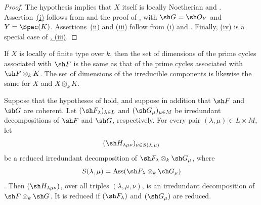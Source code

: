 \begin{proof}
The hypothesis implies that $X$ itself is locally Noetherian
 and .
Assertion~\hyperref[IV.4.2.7.i]{(i)} follows from
 and the proof of , with
$\sh G=\sh O_Y$ and $Y=\Spec(K)$.
Assertions~\hyperref[IV.4.2.7.ii]{(ii)} and
\hyperref[IV.4.2.7.iii]{(iii)} follow from
\hyperref[IV.4.2.7.i]{(i)} and .
Finally, \hyperref[IV.4.2.7.iv]{(iv)} is a special case of
\hyperref[IV.4.2.4.iii]{, (iii)}.
\end{proof}

\begin{corollary}[4.2.8]
\label{IV.4.2.8}
If $X$ is locally of finite type over $k$, then the set of dimensions
of the prime cycles associated with $\sh F$ is the same as that of the
prime cycles associated with $\sh F\otimes_k K$.
The set of dimensions of the irreducible components is likewise the
same for $X$ and $X\otimes_k K$.
\end{corollary}

\begin{proposition}[4.2.9]
\label{IV.4.2.9}
Suppose that the hypotheses of  hold, and suppose in
addition that $\sh F$ and $\sh G$ are coherent.
Let $(\sh F_\lambda)_{\lambda\in L}$ and
$(\sh G_\mu)_{\mu\in M}$ be irredundant decompositions of $\sh F$ and
$\sh G$, respectively.
For every pair $(\lambda,\mu)\in L\times M$, let
\[
(\sh H_{\lambda\mu\nu})_{\nu\in S(\lambda,\mu)}
\]
be a reduced irredundant decomposition of
$\sh F_\lambda\otimes_k\sh G_\mu$, where
\[
S(\lambda,\mu)
=\operatorname{Ass}(\sh F_\lambda\otimes_k\sh G_\mu)
\]
.
Then $(\sh H_{\lambda\mu\nu})$, over all triples
$(\lambda,\mu,\nu)$, is an irredundant decomposition of
$\sh F\otimes_k\sh G$.
It is reduced if $(\sh F_\lambda)$ and $(\sh G_\mu)$ are reduced.
\end{proposition}


